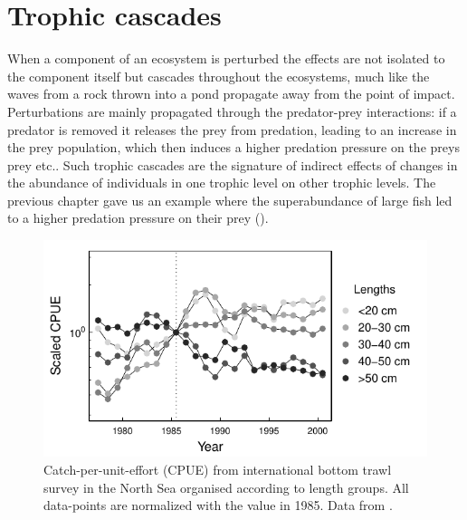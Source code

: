 \section{Trophic cascades}
\label{sec:cascades}
When a component of an ecosystem is perturbed the effects are not isolated to the component itself but cascades throughout the ecosystems, much like the waves from a rock thrown into a pond propagate away from the point of impact.  Perturbations are mainly propagated through the predator-prey interactions: if a predator is removed it releases the prey from predation, leading to an increase in the prey population, which then induces a higher predation pressure on the preys prey etc..  Such trophic cascades are the signature of indirect effects of changes in the abundance of individuals in one trophic level on other trophic levels. The previous chapter gave us an example where the superabundance of large fish led to a higher predation pressure on their prey  ().  


\begin{figure}[t]
  \centering
  \includegraphics{ChapterCommunityFishing/Daan.pdf}
  \caption{Catch-per-unit-effort (CPUE) from international bottom trawl survey in the North Sea organised according to length groups.  All data-points are normalized with the value in 1985.  Data from \citet{Daan2005}.}
  \label{fig:Daan}
\end{figure}


